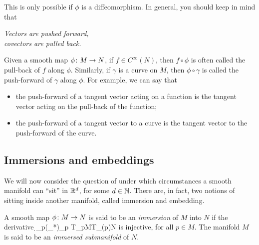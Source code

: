 \bse
{}
\ese
This is only possible if $\phi$ is a diffeomorphism. In general, you should keep in mind that
\begin{center}
\emph{Vectors are pushed forward,\\ covectors are pulled back.}
\end{center}
\er

\br
Given a smooth map $\phi\colon M \to N$, if $f\in C^\infty (N)$, then $f\circ \phi$ is often called the pull-back of $f$ along $\phi$. Similarly, if $\gamma$ is a curve on $M$, then $\phi \circ \gamma$ is called the push-forward of $\gamma$ along $\phi$. For example, we can say that 
\begin{itemize}
\item the push-forward of a tangent vector acting on a function is the tangent vector acting on the pull-back of the function;
\item the push-forward of a tangent vector to a curve is the tangent vector to the push-forward of the curve.
\end{itemize}
\er

\subsection{Immersions and embeddings}

We will now consider the question of under which circumstances a smooth manifold can ``sit'' in $\mathbb{R}^d$, for some $d\in \mathbb{N}$. There are, in fact, two notions of sitting inside another manifold, called immersion and embedding.

\bd
A smooth map $\phi\colon M \to N$ is said to be an \emph{immersion} of $M$ into $N$ if the derivative
\bse
\d_p\phi \equiv (\phi_*)_p \cl T_pM\xrightarrow{\sim}T_{\phi(p)}N
\ese
is injective, for all $p\in M$. The manifold $M$ is said to be an \emph{immersed submanifold} of $N$.
\ed

